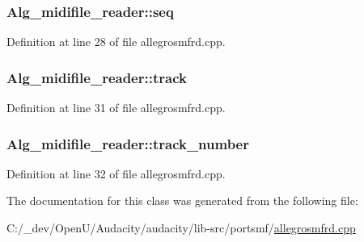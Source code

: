 \subsubsection[{\texorpdfstring{seq}{seq}}]{ Alg\+\_\+midifile\+\_\+reader\+::seq}\hypertarget{class_alg__midifile__reader_ab41a5bccce484cbc55cafe17c2fed722}{}\label{class_alg__midifile__reader_ab41a5bccce484cbc55cafe17c2fed722}


Definition at line 28 of file allegrosmfrd.\+cpp.

\subsubsection[{\texorpdfstring{track}{track}}]{ Alg\+\_\+midifile\+\_\+reader\+::track}\hypertarget{class_alg__midifile__reader_acdb63534e6db45a1bddc2a908c2e8acf}{}\label{class_alg__midifile__reader_acdb63534e6db45a1bddc2a908c2e8acf}


Definition at line 31 of file allegrosmfrd.\+cpp.

\subsubsection[{\texorpdfstring{track\+\_\+number}{track_number}}]{ Alg\+\_\+midifile\+\_\+reader\+::track\+\_\+number}\hypertarget{class_alg__midifile__reader_a9f78c142dec2238678aab094d6aeebda}{}\label{class_alg__midifile__reader_a9f78c142dec2238678aab094d6aeebda}


Definition at line 32 of file allegrosmfrd.\+cpp.



The documentation for this class was generated from the following file\+:\begin{DoxyCompactItemize}
\item 
C\+:/\+\_\+dev/\+Open\+U/\+Audacity/audacity/lib-\/src/portsmf/\hyperlink{allegrosmfrd_8cpp}{allegrosmfrd.\+cpp}\end{DoxyCompactItemize}
